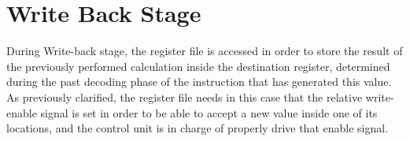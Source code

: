 \section{Write Back Stage}

During Write-back stage, the register file is accessed in order to store the result of the previously performed calculation inside the destination register,
determined during the past decoding phase of the instruction that has generated this value.
As previously clarified, the register file needs in this case that the relative write-enable signal is set in order to be able to accept a new value inside one 
of its locations, and the control unit is in charge of properly drive that enable signal.